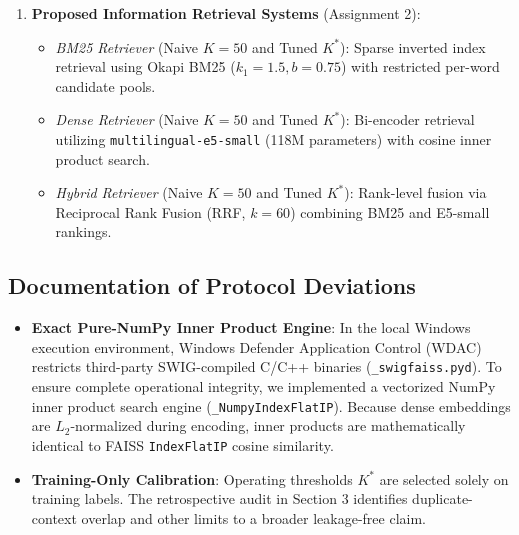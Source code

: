 \begin{enumerate}
\begin{itemize}
        \item \textit{Frozen XLM-R + Linear SVM}: Frozen \texttt{xlm-roberta-base} embeddings with Linear Support Vector Classifier.
    \end{itemize}
    \item \textbf{Proposed Information Retrieval Systems} (Assignment 2):
    \begin{itemize}
        \item \textit{BM25 Retriever} (Naive $K=50$ and Tuned $K^*$): Sparse inverted index retrieval using Okapi BM25 ($k_1=1.5, b=0.75$) with restricted per-word candidate pools.
        \item \textit{Dense Retriever} (Naive $K=50$ and Tuned $K^*$): Bi-encoder retrieval utilizing \texttt{multilingual-e5-small} (118M parameters) with cosine inner product search.
        \item \textit{Hybrid Retriever} (Naive $K=50$ and Tuned $K^*$): Rank-level fusion via Reciprocal Rank Fusion (RRF, $k=60$) combining BM25 and E5-small rankings.
    \end{itemize}
\end{enumerate}

\subsection{Documentation of Protocol Deviations}
\begin{itemize}
    \item \textbf{Exact Pure-NumPy Inner Product Engine}: In the local Windows execution environment, Windows Defender Application Control (WDAC) restricts third-party SWIG-compiled C/C++ binaries (\texttt{\_swigfaiss.pyd}). To ensure complete operational integrity, we implemented a vectorized NumPy inner product search engine (\texttt{\_NumpyIndexFlatIP}). Because dense embeddings are $L_2$-normalized during encoding, inner products are mathematically identical to FAISS \texttt{IndexFlatIP} cosine similarity.
    \item \textbf{Training-Only Calibration}: Operating thresholds $K^*$ are selected solely on training labels. The retrospective audit in Section 3 identifies duplicate-context overlap and other limits to a broader leakage-free claim.
\end{itemize}
